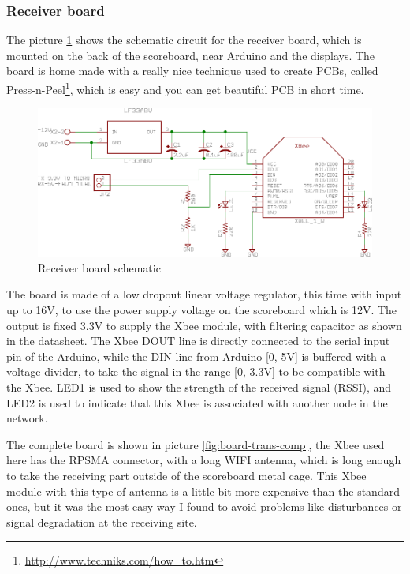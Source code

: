 \documentclass[11pt,english]{article}
\begin{document}
\subsubsection{Receiver board}\label{subsec:hd-wireless_rec}

The picture \ref{fig:board-rec-sch} shows the schematic circuit for the receiver board, which is mounted on the back of 
the scoreboard, near Arduino and the displays. 
The board is home made with a really nice technique used to create PCBs, called Press-n-Peel\footnote{\url{http://www.techniks.com/how_to.htm}}, 
which is easy and you can get beautiful PCB in short time. 
%
\begin{figure}[htb]
\centering\includegraphics[scale=1.0]{img/Receiver}

\caption{Receiver board schematic \label{fig:board-rec-sch}}

\end{figure}

The board is made of a low dropout linear voltage regulator, this time with input up to 16V, to use the power supply voltage
on the scoreboard which is 12V. The output is fixed 3.3V to supply the Xbee module, with filtering capacitor as shown in 
the datasheet. The Xbee DOUT line is directly connected to the serial input pin of the Arduino, while the DIN line from 
Arduino [0, 5V] is buffered with a voltage divider, to take the signal in the range [0, 3.3V] to be compatible with the Xbee.
LED1 is used to show the strength of the received signal (RSSI), and LED2 is used to indicate that this Xbee is associated 
with another node in the network.

The complete board is shown in picture \ref{fig:board-trans-comp}, the Xbee used here has the RPSMA connector, with a 
long WIFI antenna, which is long enough to take the receiving part outside of the scoreboard metal cage. 
This Xbee module with this type of antenna is a little bit more expensive than the standard ones, but it was the most easy 
way I found to avoid problems like disturbances or signal degradation at the receiving site.
\end{document}
